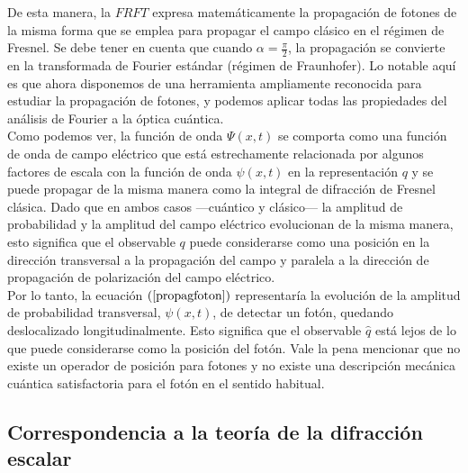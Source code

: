     De esta manera, la $FRFT$ expresa matemáticamente la propagación de fotones de la misma forma que se emplea para propagar el campo clásico en el régimen de Fresnel. Se debe tener en cuenta que cuando $\alpha = \frac{\pi}{2}$, la propagación se convierte en la transformada de Fourier estándar (régimen de Fraunhofer). Lo notable aquí es que ahora disponemos de una herramienta ampliamente reconocida para estudiar la propagación de fotones, y podemos aplicar todas las propiedades del análisis de Fourier a la óptica cuántica. \\
    
    Como podemos ver, la función de onda $\Psi(x,t)$ se comporta como una función de onda de campo eléctrico que está estrechamente relacionada por algunos factores de escala con la función de onda $\psi(x,t)$ en la representación $q$ y se puede propagar de la misma manera como la integral de difracción de Fresnel clásica. Dado que en ambos casos —cuántico y clásico— la amplitud de probabilidad y la amplitud del campo eléctrico evolucionan de la misma manera, esto significa que el observable $q$ puede considerarse como una posición en la dirección transversal a la propagación del campo y paralela a la dirección de propagación de polarización del campo eléctrico. \\
    
    Por lo tanto, la ecuación $(\ref{propagfoton})$ representaría la evolución de la amplitud de probabilidad transversal, $\psi(x,t)$, de detectar un fotón, quedando deslocalizado longitudinalmente. Esto significa que el observable $\hat{q}$ está lejos de lo que puede considerarse como la posición del fotón. Vale la pena mencionar que no existe un operador de posición para fotones y no existe una descripción mecánica cuántica satisfactoria para el fotón en el sentido habitual.
    
    
    \subsection{Correspondencia a la teoría de la difracción escalar}
    
